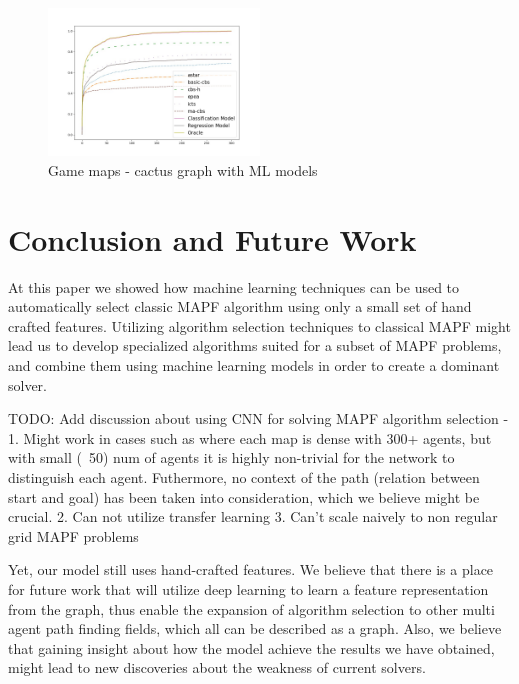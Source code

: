 \documentclass[letterpaper]{article} %
\begin{document}
\begin{figure}[h]
    \centering
    \includegraphics[width=0.5\textwidth]{images/game-cactus.jpg}
    \caption{Game maps - cactus graph with ML models}
    \label{fig:3}
\end{figure}



\section{Conclusion and Future Work}
At this paper we showed how machine learning techniques can be used to automatically select classic MAPF algorithm using only a small set of hand crafted features. Utilizing algorithm selection techniques to classical MAPF might lead us to develop specialized algorithms suited for a subset of MAPF problems, and combine them using machine learning models in order to create a dominant solver.

TODO: Add discussion about using CNN for solving MAPF algorithm selection  - 1. Might work in cases such as \cite{sigurdson2019deep} where each map is dense with 300+ agents, but with small (~50) num of agents it is highly non-trivial for the network to distinguish each agent. Futhermore, no context of the path (relation between start and goal) has been taken into consideration, which we believe might be crucial.
2. Can not utilize transfer learning
3. Can't scale naively to non regular grid MAPF problems

Yet, our model still uses hand-crafted features. We believe that there is a place for future work that will utilize deep learning to learn a feature representation from the graph, thus enable the expansion of algorithm selection to other multi agent path finding fields, which all can be described as a graph. Also, we believe that gaining insight about how the model achieve the results we have obtained, might lead to new discoveries about the weakness of current solvers.
\end{document}
